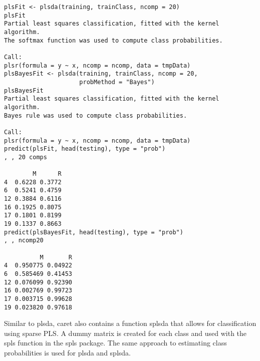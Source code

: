 \documentclass[caret-main.tex]{subfiles}
\begin{document}
\begin{framed}
\begin{verbatim}
plsFit <- plsda(training, trainClass, ncomp = 20)
plsFit
Partial least squares classification, fitted with the kernel algorithm.
The softmax function was used to compute class probabilities.

Call:
plsr(formula = y ~ x, ncomp = ncomp, data = tmpData)
plsBayesFit <- plsda(training, trainClass, ncomp = 20,
                     probMethod = "Bayes")
plsBayesFit
Partial least squares classification, fitted with the kernel algorithm.
Bayes rule was used to compute class probabilities.

Call:
plsr(formula = y ~ x, ncomp = ncomp, data = tmpData)
predict(plsFit, head(testing), type = "prob")
, , 20 comps

        M      R
4  0.6228 0.3772
6  0.5241 0.4759
12 0.3884 0.6116
16 0.1925 0.8075
17 0.1801 0.8199
19 0.1337 0.8663
predict(plsBayesFit, head(testing), type = "prob")
, , ncomp20

          M       R
4  0.950775 0.04922
6  0.585469 0.41453
12 0.076099 0.92390
16 0.002769 0.99723
17 0.003715 0.99628
19 0.023820 0.97618

\end{verbatim}
\end{framed}
Similar to plsda, caret also contains a function splsda that allows for classification using sparse PLS. A dummy matrix is created for each class and used with the spls function in the spls package. The same approach to estimating class probabilities is used for plsda and splsda.
\end{document}
